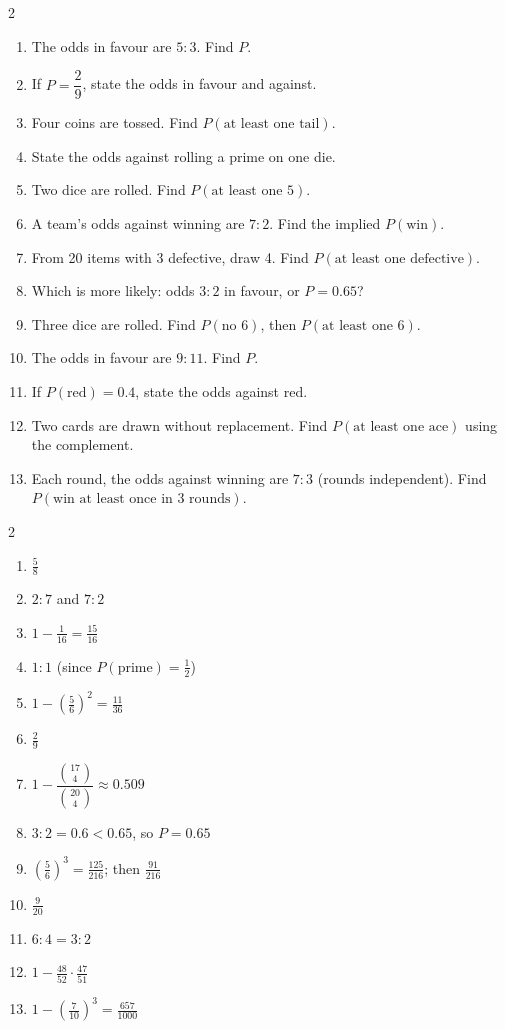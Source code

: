 \documentclass[11pt]{article}
\begin{document}
\clearpage
{}

\begin{recapbox}
\begin{multicols}{2}
\small
\begin{enumerate}[leftmargin=*,itemsep=3pt]
  \item The odds in favour are $5:3$. Find $P$.
  \item If $P=\dfrac29$, state the odds in favour and against.
  \item Four coins are tossed. Find $P(\text{at least one tail})$.
  \item State the odds against rolling a prime on one die.
  \item Two dice are rolled. Find $P(\text{at least one 5})$.
  \item A team's odds against winning are $7:2$. Find the implied $P(\text{win})$.
  \item From 20 items with 3 defective, draw 4. Find $P(\text{at least one defective})$.
  \item Which is more likely: odds $3:2$ in favour, or $P=0.65$?
  \item Three dice are rolled. Find $P(\text{no 6})$, then $P(\text{at least one 6})$.
  \item The odds in favour are $9:11$. Find $P$.
  \item If $P(\text{red})=0.4$, state the odds against red.
  \item Two cards are drawn without replacement. Find $P(\text{at least one ace})$ using the complement.
  \item Each round, the odds against winning are $7:3$ (rounds independent). Find $P(\text{win at least once in 3 rounds})$.
\end{enumerate}
\end{multicols}
\end{recapbox}

\begin{keybox}
\begin{multicols}{2}
\small
\begin{enumerate}[leftmargin=*,itemsep=3pt]
  \item $\tfrac58$
  \item $2:7$ and $7:2$
  \item $1-\tfrac{1}{16}=\tfrac{15}{16}$
  \item $1:1$ (since $P(\text{prime})=\tfrac12$)
  \item $1-\left(\tfrac56\right)^2=\tfrac{11}{36}$
  \item $\tfrac29$
  \item $1-\dfrac{\binom{17}{4}}{\binom{20}{4}}\approx0.509$
  \item $3:2=0.6<0.65$, so $P=0.65$
  \item $\left(\tfrac56\right)^3=\tfrac{125}{216}$; then $\tfrac{91}{216}$
  \item $\tfrac{9}{20}$
  \item $6:4=3:2$
  \item $1-\tfrac{48}{52}\cdot\tfrac{47}{51}$
  \item $1-\left(\tfrac{7}{10}\right)^3=\tfrac{657}{1000}$
\end{enumerate}
\end{multicols}
\end{keybox}
\end{document}

